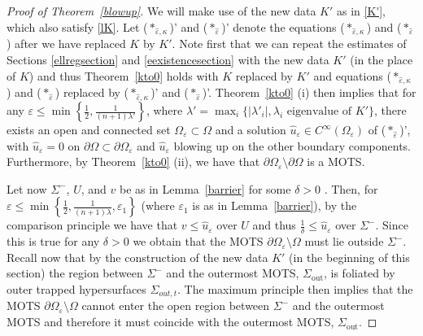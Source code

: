 \documentclass[11pt]{amsart}
\renewcommand{\epsilon}{\varepsilon}
\def\e{\epsilon}
\def\l{\lambda}
\def\k{\kappa}
\def\out{\text{out}}
\begin{document}
\begin{proof}[Proof of Theorem~\ref{blowup}] 
We will make use of  the new data $K'$ as in  \eqref{K'}, which also satisfy \eqref{lK}. Let ($*_{\hat \e, \k}$)' and ($*_{\hat\e}$)' denote the equations ($*_{\hat \e, \k}$) and ($*_{\hat\e}$) after we have replaced $K$ by $K'$.
Note first that we can repeat the estimates of Sections \ref{ellregsection} and \ref{eexistencesection} with the new data $K'$ (in the place of $K$) and thus Theorem~\ref{kto0} holds with $K$ replaced by $K'$ and equations ($*_{\hat \e, \k}$) and ($*_{\hat\e}$) replaced by ($*_{\hat \e, \k}$)' and ($*_{\hat\e}$)'. Theorem~\ref{kto0} (i) then implies that for any $\e\le \min\left\{\frac12, \frac{1}{(n+1)\l'}\right\}$, where $\lambda'=\max_i\{|\l'_i|, \l_i\text{  eigenvalue of  } K'\}$, there exists an open and connected set $\Omega_\e\subset \Omega$ and a solution  $\hat u_\e\in C^\infty(\Omega_\e)$ of ($*_{\hat\e}$)', with $\hat u_\e=0$ on $\partial \Omega\subset \partial\Omega_\e$ and $\hat u_\e$ blowing up on the other boundary components. Furthermore, by  Theorem~\ref{kto0} (ii), we have that $\partial \Omega_\e\setminus\partial \Omega$ is a MOTS. 

Let now $\Sigma^-$,  $U$,  and $v$ be as in Lemma~\ref{barrier} for some $\delta>0$ . Then, for $\e\le \min\left\{\frac12, \frac{1}{(n+1)\l}, \e_1\right\}$ (where  $\e_1$ is as in  Lemma~\ref{barrier}), by the comparison principle we have that $v\le \hat u_\e$ over $U$ and thus $\frac{1}{\delta}\le \hat u_\e$ over $\Sigma^-$. Since this is true for any $\delta>0$ we obtain  that the MOTS $\partial\Omega_\e\setminus \Omega$ must lie outside $\Sigma^-$. Recall now that by the construction of the new data $K'$ (in the beginning of this section) the region between $\Sigma^-$ and the outermost MOTS, $\Sigma_\out$, is foliated by outer trapped hypersurfaces $\Sigma_{out,t}$. The maximum principle then implies that the MOTS $\partial\Omega_\e\setminus \Omega$ cannot enter the open region between $\Sigma^-$ and the outermost MOTS and therefore it must coincide with the outermost MOTS, $\Sigma_\out$.
\end{proof}
\end{document}
